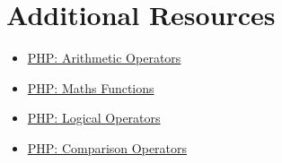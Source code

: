 \section{Additional Resources}

\begin{itemize}[leftmargin=*]
    \item \href{https://www.php.net/manual/en/language.operators.arithmetic.php}{PHP: Arithmetic Operators}
    \item \href{https://www.php.net/manual/en/ref.math.php}{PHP: Maths Functions}
    \item \href{http://php.net/manual/en/language.operators.logical.php}{PHP: Logical Operators}
    \item \href{http://php.net/manual/en/language.operators.comparison.php}{PHP: Comparison Operators}
\end{itemize}
